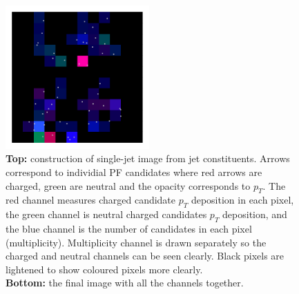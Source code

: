 \begin{figure}[h!]
\begin{center}
        \includegraphics[width=0.49\textwidth]{figures/event_selection/full_image_rect.pdf}
    \end{center}
    \caption{\textbf{Top:} 
             construction of single-jet image from jet constituents. Arrows correspond to individial PF candidates where red arrows are charged, green are neutral and the opacity corresponds to $p_{T}$.
             The red channel measures charged candidate $p_T$ deposition in each pixel, 
             the green channel is neutral charged candidates $p_T$ deposition, 
             and the blue channel is the number of candidates in each pixel (multiplicity). 
             Multiplicity channel is drawn separately so the charged and neutral channels can be seen clearly. Black pixels are lightened to show coloured pixels more clearly.\\
             \textbf{Bottom:} 
             the final image with all the channels together.}
    \label{fig:event_categorisation:jet_image}
\end{figure}


